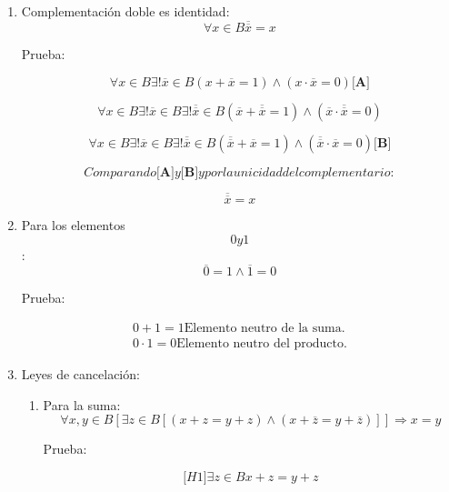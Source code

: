 \begin{enumerate}
\begin{enumerate}
\begin{enumerate}
      \[\mathit{luego}{a \neq \overline{a}}\]
    \item
      Complementación doble es identidad:
      \[\forall{x \in B}{\overline{\overline{x}} = x}\]

      Prueba:

      \[\forall{x \in B}\exists\mathtt{\mathrm{!}}{\overline{x} \in B}{\left( {{x + \overline{x}} = 1} \right) \land \left( {{x \cdot \overline{x}} = 0} \right)}{\lbrack\mathbf{A}\rbrack}\]

      \[\forall{x \in B}{\exists\mathtt{\mathrm{!}}}{\overline{x} \in B}{\exists\mathtt{\mathrm{!}}}{\overline{\overline{x}} \in B}{\left( {{\overline{x} + \overline{\overline{x}}} = 1} \right) \land \left( {{\overline{x} \cdot \overline{\overline{x}}} = 0} \right)}\]

      \[\forall{x \in B}{\exists\mathtt{\mathrm{!}}}{\overline{x} \in B}{\exists\mathtt{\mathrm{!}}}{\overline{\overline{x}} \in B}{\left( {{\overline{\overline{x}} + \overline{x}} = 1} \right) \land \left( {{\overline{\overline{x}} \cdot \overline{x}} = 0} \right)}{\lbrack\mathbf{B}\rbrack}\]

      \[\mathit{Comparando}{\lbrack\mathbf{A}\rbrack}y{\lbrack\mathbf{B}\rbrack}y\mathit{por}\mathit{la}\mathit{unicidad}\mathit{del}\mathit{complementario}:\]

      \[\overline{\overline{x}} = x\]
    \item
      Para los elementos \[0y1\]:
      \[{\overline{0} = 1} \land {\overline{1} = 0}\]

      Prueba:

      \[\begin{matrix}
      {{{0 + 1} = 1}\text{Elemento neutro de la suma.}} \\
      {0{\cdot}1{= 0}\text{Elemento neutro del producto.}}
      \end{matrix}\]
    \item
      Leyes de cancelación:

      \begin{enumerate}
      \def\labelenumiv{\arabic{enumiv}.}
      \item
        Para la
        suma:\[\forall x,{y \in B}\left\lbrack {\exists{z \in B}\left\lbrack {\left( {{x + z} = {y + z}} \right) \land \left( {{x + \overline{z}} = {y + \overline{z}}} \right)} \right\rbrack} \right\rbrack\Rightarrow{x = y}\]

        Prueba:

        \[{\lbrack\mathit{H1}\rbrack}\exists{z \in B}{{x + z} = {y + z}}\]


\end{enumerate}
\end{enumerate}
\end{enumerate}
\end{enumerate}
